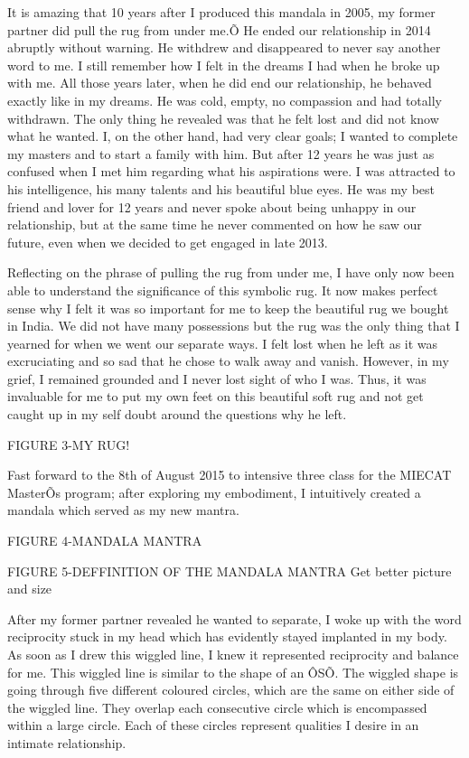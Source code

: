 It is amazing that 10 years after I produced this mandala in 2005, my former partner did pull the rug from under me.Õ He ended our relationship in 2014 abruptly without warning. He withdrew and disappeared to never say another word to me. I still remember how I felt in the dreams I had when he broke up with me. All those years later, when he did end our relationship, he behaved exactly like in my dreams. He was cold, empty, no compassion and had totally withdrawn. The only thing he revealed was that he felt lost and did not know what he wanted. I, on the other hand, had very clear goals; I wanted to complete my masters and to start a family with him. But after 12 years he was just as confused when I met him regarding what his aspirations were. I was attracted to his intelligence, his many talents and his beautiful blue eyes. He was my best friend and lover for 12 years and never spoke about being unhappy in our relationship, but at the same time he never commented on how he saw our future, even when we decided to get engaged in late 2013. 

Reflecting on the phrase of pulling the rug from under me, I have only now been able to understand the significance of this symbolic rug. It now makes perfect sense why I felt it was so important for me to keep the beautiful rug we bought in India. We did not have many possessions but the rug was the only thing that I yearned for when we went our separate ways. I felt lost when he left as it was excruciating and so sad that he chose to walk away and vanish. However, in my grief, I remained grounded and I never lost sight of who I was. Thus, it was invaluable for me to put my own feet on this beautiful soft rug and not get caught up in my self doubt around the questions why he left.

FIGURE 3-MY RUG!

Fast forward to the 8th of August 2015 to intensive three class for the MIECAT MasterÕs program; after exploring my embodiment, I intuitively created a mandala which served as my new mantra. 

FIGURE 4-MANDALA MANTRA

FIGURE 5-DEFFINITION OF THE MANDALA MANTRA
Get better picture and size

After my former partner revealed he wanted to separate, I woke up with the word reciprocity stuck in my head which has evidently stayed implanted in my body. As soon as I drew this wiggled line, I knew it represented reciprocity and balance for me. This wiggled line is similar to the shape of an ÔSÕ. The wiggled shape is going through five different coloured circles, which are the same on either side of the wiggled line. They overlap each consecutive circle which is encompassed within a large circle. Each of these circles represent qualities I desire in an intimate relationship. 

